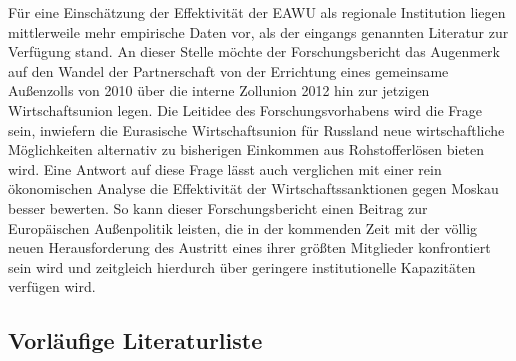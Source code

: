 \documentclass[11pt,a4paper]{article}
\begin{document}
Für eine Einschätzung der Effektivität der EAWU als regionale Institution liegen mittlerweile mehr empirische Daten vor, als der eingangs genannten Literatur zur Verfügung stand. An dieser Stelle möchte der Forschungsbericht das Augenmerk auf den Wandel der Partnerschaft von der Errichtung eines gemeinsame Außenzolls von 2010 über die interne Zollunion 2012 hin zur jetzigen Wirtschaftsunion legen. Die Leitidee des Forschungsvorhabens wird die Frage sein, inwiefern die Eurasische Wirtschaftsunion für Russland neue wirtschaftliche Möglichkeiten alternativ zu bisherigen Einkommen aus Rohstofferlösen bieten wird. Eine Antwort auf diese Frage lässt auch verglichen mit einer rein ökonomischen Analyse die Effektivität der Wirtschaftssanktionen gegen Moskau besser bewerten. So kann dieser Forschungsbericht einen Beitrag zur Europäischen Außenpolitik leisten, die in der kommenden Zeit mit der völlig neuen Herausforderung des Austritt eines ihrer größten Mitglieder konfrontiert sein wird und zeitgleich hierdurch über geringere institutionelle Kapazitäten verfügen wird.
 



\subsection*{\color{yellowcolor} Vorläufige Literaturliste}
\end{document}
